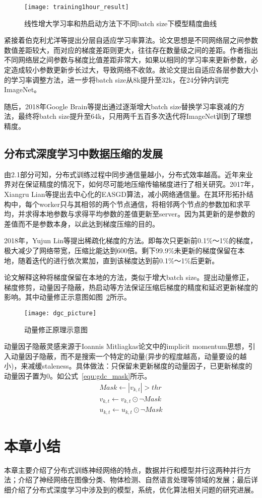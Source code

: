\begin{figure}[htp]
\centering
\texttt{[image: training1hour\_result]}
\caption{线性增大学习率和热启动方法下不同batch size下模型精度曲线}
\label{fig:training1hour_result}
\end{figure}
紧接着伯克利尤洋等提出分层自适应学习率算法。论文思想是不同网络层之间参数数值差距较大，而对应的梯度差距则更大，往往存在数量级之间的差距。作者指出不同网络层之间参数与梯度比值差距非常大，如果以相同的学习率来更新参数，必定造成较小参数更新步长过大，导致网络不收敛。故论文提出自适应各层参数大小的学习率调整方法，进一步将batch size从8k提升至32k，在24分钟内训完ImageNet。

随后，2018年Google Brain等提出通过逐渐增大batch size替换学习率衰减的方法，最终将batch size提升至64k，只用两千五百多次迭代将ImageNet训到了理想精度。

\subsection{分布式深度学习中数据压缩的发展}
由2.1部分可知，分布式训练过程中同步通信量越小，分布式效率越高。近年来业界对在保证精度的情况下，如何尽可能地压缩传输梯度进行了相关研究。2017年，Xiangru Lian等提出去中心化的EASGD算法，减小网络通信量。在其环形拓扑结构中，每个worker只与其相邻的两个节点通信，将相邻两个节点的参数加和求平均，并求得本地参数与求得平均参数的差值更新至server。因为其更新的是参数的差值而不是参数本身，以此达到梯度压缩的目的。

2018年，Yujun Lin等提出稀疏化梯度的方法。即每次只更新前0.1\%～1\%的梯度，极大减少了网络带宽，压缩比能达到600倍。剩下99.9\%未更新的梯度保留在本地，随着迭代的进行依次累加，直到该梯度达到前0.1\%～1\%后更新。

论文解释这种将梯度保留在本地的方法，类似于增大batch size。提出动量修正，梯度修剪，动量因子隐蔽，热启动等方法保证压缩后梯度的精度和延迟更新梯度的影响。其中动量修正示意图如图~\ref{fig:dgc_picture}所示。
\begin{figure}[htp]
\centering
\texttt{[image: dgc\_picture]}
\caption{动量修正原理示意图}
\label{fig:dgc_picture}
\end{figure}

动量因子隐蔽灵感来源于Ioannis Mitliagkas论文中的implicit momentum思想，引入动量因子隐蔽，而不是搜索一个特定的动量(异步的程度越高，动量要设的越小)，来减缓staleness。具体做法：只保留未更新梯度的动量因子，已更新梯度的动量因子置为0。如公式~\ref{equ:gdc_mask}所示。
\begin{equation}
\label{equ:gdc_mask}
\begin{split}
Mask\leftarrow |v_{k,t}|>thr \\
v_{k,t}\leftarrow v_{k,t}\odot ¬Mask \\
u_{k,t}\leftarrow u_{k,t}\odot¬Mask
\end{split}
\end{equation}

\section{本章小结}
本章主要介绍了分布式训练神经网络的特点，数据并行和模型并行这两种并行方法；介绍了神经网络在图像分类、物体检测、自然语言处理等领域的发展；最后详细介绍了分布式深度学习中涉及到的模型，系统，优化算法相关问题的研究进展。




